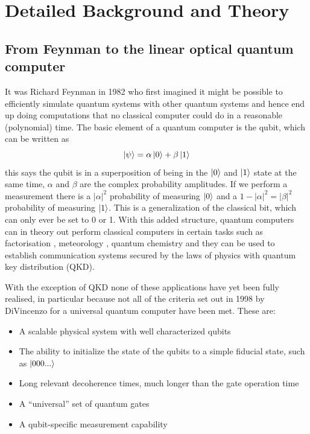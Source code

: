 \newpage
\section{Detailed Background and Theory}
\subsection{From Feynman to the linear optical quantum computer}
It was Richard Feynman in 1982\cite{feynman_simulating_1982} who first imagined it might be possible to efficiently simulate quantum systems with other quantum systems and hence end up doing computations that no classical computer could do in a reasonable (polynomial) time. The basic element of a quantum computer is the qubit, which can be written as
\begin{equation}
\ket{\psi}=\alpha \ket{0}+\beta\ket{1}
\end{equation}
this says the qubit is in a superposition of being in the $\ket{0}$ and $\ket{1}$ state at the same time, $\alpha$ and $\beta$ are the complex probability amplitudes. If we perform a measurement there is a $|\alpha|^2$ probability of measuring $\ket{0}$ and a $1-|\alpha|^2=|\beta|^2$ probability of measuring $\ket{1}$. This is a generalization of the classical bit, which can only ever be set to 0 or 1. With this added structure, quantum computers can in theory out perform classical computers in certain tasks such as factorisation \cite{shor_polynomial-time_1995}, meteorology \cite{toth_quantum_2014}, quantum chemistry\cite{georgescu_quantum_2014} and they can be used to establish communication systems secured by the laws of physics with quantum key distribution (QKD)\cite{zhang_reference-frame-independent_2014}.

With the exception of QKD none of these applications have yet been fully realised, in particular because not all of the criteria  \cite{divincenzo_quantum_1998} set out in 1998 by DiVincenzo for a universal quantum  computer have been met. These are:
\begin{itemize}
	\item A scalable physical system with well characterized
qubits
	\item The ability to initialize the state of the qubits to a
simple fiducial state, such as $\ket{000...}$
	\item Long relevant decoherence times, much longer than
the gate operation time
	\item A “universal” set of quantum gates
	\item A qubit-specific measurement capability
\end{itemize}


